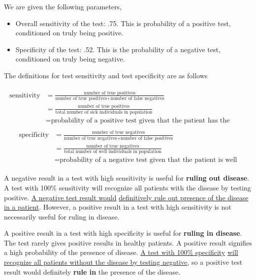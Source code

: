 \documentclass{homework}
\begin{document}
We are given the following parameters,

\begin{itemize}
    \item Overall sensitivity of the test: .75. This is probability of a positive test, conditioned on truly being positive.
    \item Specificity of the test: .52. This is the probability of a negative test, conditioned on truly being negative.
\end{itemize}

The definitions for test sensitivity and test specificity are as follows

\begin{align*}
    {\displaystyle {\begin{aligned}{\text{sensitivity}}&={\frac {\text{number of true positives}}{{\text{number of true positives}}+{\text{number of false negatives}}}}\\[8pt]&={\frac {\text{number of true positives}}{\text{total number of sick individuals in population}}}\\[8pt]&={\text{probability of a positive test given that the patient has the disease}}\end{aligned}}}
\end{align*}
\begin{align*}
    {\displaystyle {\begin{aligned}{\text{specificity}}&={\frac {\text{number of true negatives}}{{\text{number of true negatives}}+{\text{number of false positives}}}}\\[8pt]&={\frac {\text{number of true negatives}}{\text{total number of well individuals in population}}}\\[8pt]&={\text{probability of a negative test given that the patient is well}}\end{aligned}}}
\end{align*}

A negative result in a test with high sensitivity is useful for \textbf{ruling out disease}. A test with 100\% sensitivity will recognize all patients with the disease by testing positive. \underline{A negative test result would} \underline{definitively rule out presence of the disease in a patient}. However, a positive result in a test with high sensitivity is not necessarily useful for ruling in disease. 

A positive result in a test with high specificity is useful for \textbf{ruling in disease}. The test rarely gives positive results in healthy patients. A positive result signifies a high probability of the presence of disease. \underline{A test with 100\% specificity} \underline{will recognize all patients without the disease by testing negative}, so a positive test result would definitely \textbf{rule in} the presence of the disease.
\end{document}
